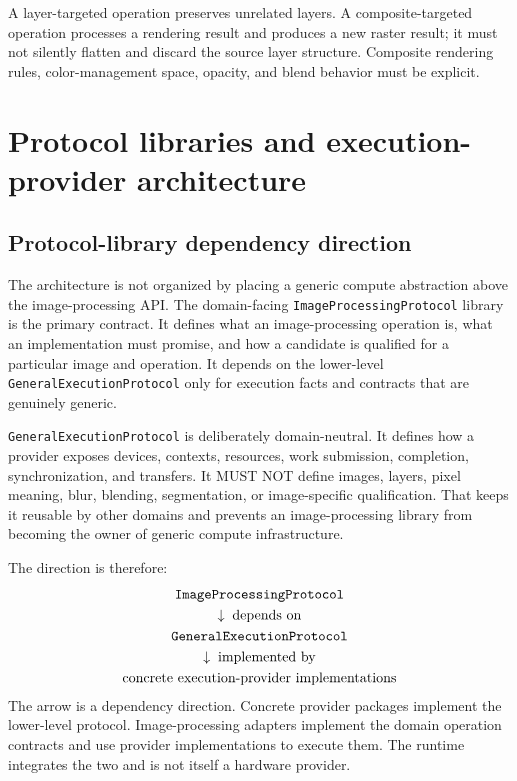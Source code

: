 \documentclass[11pt,a4paper,oneside]{article}
\begin{document}
A layer-targeted operation preserves unrelated layers. A composite-targeted operation processes a rendering result and produces a new raster result; it must not silently flatten and discard the source layer structure. Composite rendering rules, color-management space, opacity, and blend behavior must be explicit.

\section{Protocol libraries and execution-provider architecture}

\subsection{Protocol-library dependency direction}

The architecture is not organized by placing a generic compute abstraction above the image-processing API. The domain-facing \texttt{ImageProcessing\allowbreak Protocol} library is the primary contract. It defines what an image-processing operation is, what an implementation must promise, and how a candidate is qualified for a particular image and operation. It depends on the lower-level \texttt{GeneralExecution\allowbreak Protocol} only for execution facts and contracts that are genuinely generic.

\texttt{GeneralExecution\allowbreak Protocol} is deliberately domain-neutral. It defines how a provider exposes devices, contexts, resources, work submission, completion, synchronization, and transfers. It MUST NOT define images, layers, pixel meaning, blur, blending, segmentation, or image-specific qualification. That keeps it reusable by other domains and prevents an image-processing library from becoming the owner of generic compute infrastructure.

The direction is therefore:
\[
\begin{gathered}
  \texttt{ImageProcessing\allowbreak Protocol}\\
  \downarrow\;\text{depends on}\\
  \texttt{GeneralExecution\allowbreak Protocol}\\
  \downarrow\;\text{implemented by}\\
  \text{concrete execution-provider implementations}
\end{gathered}
\]
The arrow is a dependency direction. Concrete provider packages implement the lower-level protocol. Image-processing adapters implement the domain operation contracts and use provider implementations to execute them. The runtime integrates the two and is not itself a hardware provider.
\end{document}
